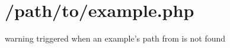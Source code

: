 \hypertarget{_2path_2to_2example_8php-example}{\section{/path/to/example.\-php}
}
warning triggered when an example's path from is not found


\begin{DoxyCodeInclude}
\end{DoxyCodeInclude}
 